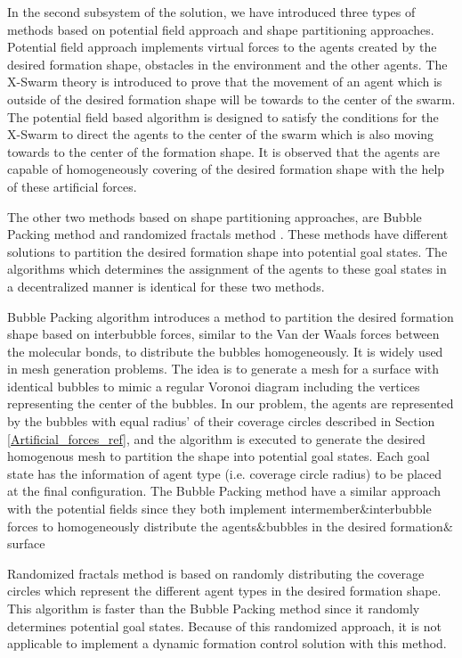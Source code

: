 In the second subsystem of the solution, we have introduced three types of methods based on potential field approach and shape partitioning approaches. Potential field approach implements virtual forces to the agents created by the desired formation shape, obstacles in the environment and the other agents. The X-Swarm theory is introduced to prove that the movement of an agent which is outside of the desired formation shape will be towards to the center of the swarm. The potential field based algorithm is designed to satisfy the conditions for the X-Swarm to direct the agents to the center of the swarm which is also moving towards to the center of the formation shape. It is observed that the agents are capable of homogeneously covering of the desired formation shape with the help of these artificial forces.

The other two methods based on shape partitioning approaches, are Bubble Packing method and randomized fractals method . These methods have different solutions to partition the desired formation shape into potential goal states. The algorithms which determines the assignment of the agents to these goal states in a decentralized manner is identical for these two methods. 

Bubble Packing algorithm introduces a method to partition the desired formation shape based on interbubble forces, similar to the Van der Waals forces between the molecular bonds, to distribute the bubbles homogeneously. It is widely used in mesh generation problems. The idea is to generate a mesh for a surface with identical bubbles to mimic a regular Voronoi diagram including the vertices representing the center of the bubbles. In our problem, the agents are represented by the  bubbles with equal radius' of their coverage circles described in Section \ref{Artificial_forces_ref}, and the algorithm is executed to generate the desired homogenous mesh to partition the shape into potential goal states. Each goal state has the information of agent type (i.e. coverage circle radius) to be placed at the final configuration. The Bubble Packing method have a similar approach with the potential fields since they both implement intermember$\&$interbubble forces to homogeneously distribute the agents$\&$bubbles in the desired formation$\&$surface 
       
Randomized fractals method is based on randomly distributing the coverage circles which represent the different agent types in the desired formation shape. This algorithm is faster than the Bubble Packing method since it randomly determines potential goal states. Because of this randomized approach, it is not applicable to implement a dynamic formation control solution with this method. 
       
